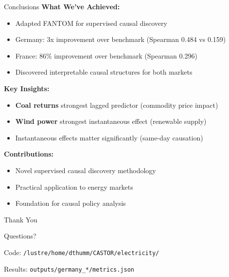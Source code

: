 \documentclass[aspectratio=169]{beamer}
\begin{document}
\begin{frame}{Conclusions}
\textbf{What We've Achieved:}
\begin{itemize}
    \item \textcolor{reprogreen}{Adapted FANTOM for supervised causal discovery}
    \item \textcolor{reprogreen}{Germany: 3x improvement over benchmark (Spearman 0.484 vs 0.159)}
    \item \textcolor{reprogreen}{France: 86\% improvement over benchmark (Spearman 0.296)}
    \item \textcolor{reprogreen}{Discovered interpretable causal structures for both markets}
\end{itemize}

\vspace{0.3cm}
\textbf{Key Insights:}
\begin{itemize}
    \item \textbf{Coal returns} strongest lagged predictor (commodity price impact)
    \item \textbf{Wind power} strongest instantaneous effect (renewable supply)
    \item Instantaneous effects matter significantly (same-day causation)
\end{itemize}

\vspace{0.3cm}
\textbf{Contributions:}
\begin{itemize}
    \item Novel supervised causal discovery methodology
    \item Practical application to energy markets
    \item Foundation for causal policy analysis
\end{itemize}
\end{frame}

\begin{frame}
\centering
\Huge Thank You

\vspace{1cm}
\Large Questions?

\vspace{1cm}
\normalsize
Code: \texttt{/lustre/home/dthumm/CASTOR/electricity/}

\vspace{0.3cm}
Results: \texttt{outputs/germany\_*/metrics.json}
\end{frame}
\end{document}
